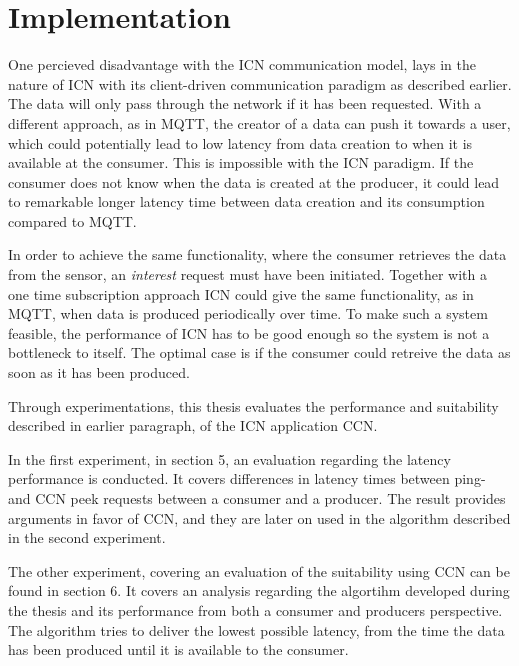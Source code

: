 \section{Implementation}
One percieved disadvantage with the ICN communication model, lays in the nature of ICN with its client-driven communication paradigm as described earlier. The data will only pass through the network if it has been requested. With a different approach, as in MQTT, the creator of a data can push it towards a user, which could potentially lead to low latency from data creation to when it is available at the consumer. This is impossible with the ICN paradigm. If the consumer does not know when the data is created at the producer, it could lead to remarkable longer latency time between data creation and its consumption compared to MQTT.%

In order to achieve the same functionality, where the consumer retrieves the data from the sensor, an \textit{interest} request must have been initiated. Together with a one time subscription approach ICN could give the same functionality, as in MQTT, when data is produced periodically over time. To make such a system feasible, the performance of ICN has to be good enough so the system is not a bottleneck to itself. The optimal case is if the consumer could retreive the data as soon as it has been produced.

Through experimentations, this thesis evaluates the performance and suitability described in earlier paragraph, of the ICN application CCN.

In the first experiment, in section 5, an evaluation regarding the latency performance is conducted. It covers differences in latency times between ping- and CCN peek requests between a consumer and a producer. The result provides arguments in favor of CCN, and they are later on used in the algorithm described in the second experiment.

The other experiment, covering an evaluation of the suitability using CCN can be found in section 6. It covers an analysis regarding the algortihm developed during the thesis and its performance from both a consumer and producers perspective. The algorithm tries to deliver the lowest possible latency, from the time the data has been produced until it is available to the consumer. 


